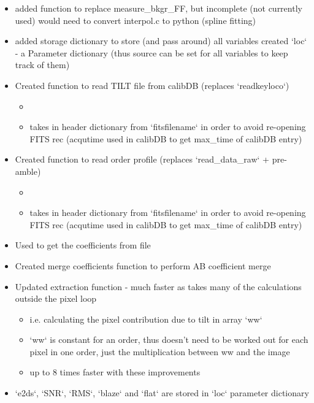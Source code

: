 \begin{itemize}
\item added function to replace measure\_bkgr\_FF, but incomplete (not currently used) would need to convert interpol.c to python (spline fitting)

\item added storage dictionary to store (and pass around) all variables created `loc` - a Parameter dictionary (thus source can be set for all variables to keep track of them)

\item Created function to read TILT file from calibDB (replaces `readkeyloco`)
	\begin{itemize}
    \item {}
    \item takes in header dictionary from `fitsfilename` in order to avoid re-opening FITS rec (acqutime used in calibDB to get max\_time of calibDB entry) 
    \end{itemize}
\item Created function to read order profile (replaces `read\_data\_raw` + pre-amble)
	\begin{itemize}
	\item {}
	\item takes in header dictionary from `fitsfilename` in order to avoid re-opening FITS rec (acqutime used in calibDB to get max\_time of calibDB entry) 
    \end{itemize}
\item Used  to get the coefficients from file

\item Created merge coefficients function to perform AB coefficient merge 
    
\item Updated extraction function  - much faster as takes many of the calculations outside the pixel loop
	\begin{itemize}
	\item i.e. calculating the pixel contribution due to tilt in array `ww`
	\item `ww` is constant for an order, thus doesn't need to be worked out for each pixel in one order, just the multiplication between ww and the image
	\item up to 8 times faster with these improvements
    \end{itemize}
\item `e2ds`, `SNR`, `RMS`, `blaze` and `flat` are stored in `loc` parameter dictionary


\end{itemize}
